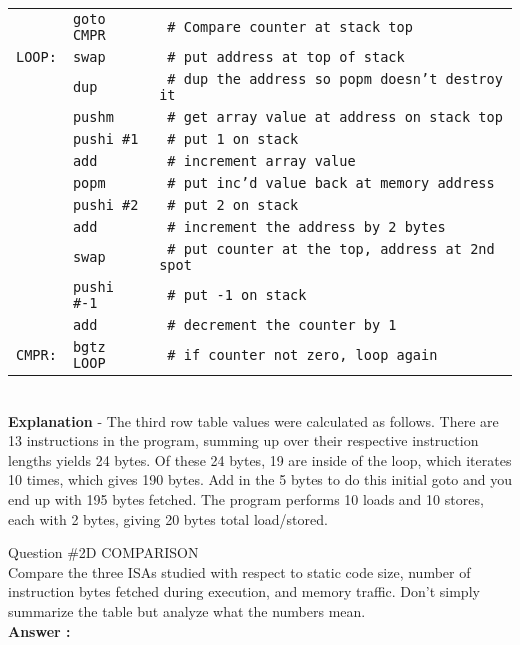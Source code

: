 \documentclass[a4paper,11pt]{article}
\newcommand{\answer}{\textbf{Answer : }}
\begin{document}
   \begin{tabular}{l l  l}
      \texttt{}       & \texttt{goto CMPR}  & \texttt{ \# Compare counter at stack top} \\
      \texttt{LOOP:}  & \texttt{swap}       & \texttt{ \# put address at top of stack} \\
      \texttt{}       & \texttt{dup}        & \texttt{ \# dup the address so popm doesn't destroy it} \\
      \texttt{}       & \texttt{pushm}      & \texttt{ \# get array value at address on stack top} \\
      \texttt{}       & \texttt{pushi \#1}  & \texttt{ \# put 1 on stack} \\
      \texttt{}       & \texttt{add}        & \texttt{ \# increment array value} \\
      \texttt{}       & \texttt{popm}       & \texttt{ \# put inc'd value back at memory address} \\
      \texttt{}       & \texttt{pushi \#2}  & \texttt{ \# put 2 on stack} \\
      \texttt{}       & \texttt{add}        & \texttt{ \# increment the address by 2 bytes} \\
      \texttt{}       & \texttt{swap}       & \texttt{ \# put counter at the top, address at 2nd spot} \\
      \texttt{}       & \texttt{pushi \#-1} & \texttt{ \# put -1 on stack} \\
      \texttt{}       & \texttt{add}        & \texttt{ \# decrement the counter by 1} \\  
      \texttt{CMPR:}  & \texttt{bgtz LOOP}  & \texttt{ \# if counter not zero, loop again} \\   
   \end{tabular} \\

  \textbf{Explanation} - The third row table values were calculated as follows. There are 13 instructions in the program, summing up over their respective instruction lengths yields 24 bytes. Of these 24 bytes, 19 are inside of the loop, which iterates 10 times, which gives 190 bytes. Add in the 5 bytes to do this initial goto and you end up with 195 bytes fetched. The program performs 10 loads and 10 stores, each with 2 bytes, giving 20 bytes total load/stored.


 \item Question \#2D COMPARISON \\
 Compare the three ISAs studied with respect to static code size, number of instruction bytes fetched during execution, and memory traffic. Don’t simply summarize the table but analyze what the numbers mean. \\ \answer \\
\end{document}
